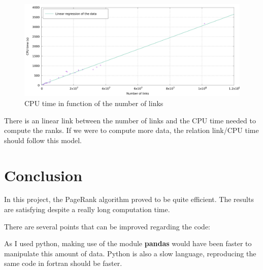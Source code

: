\begin{figure}[htbp]
    \centering
    \includegraphics[width=.8\linewidth]{project/graph.pdf}
    \caption{CPU time in function of the number of links}
\end{figure}

There is an linear link between the number of links and the CPU time needed to compute the ranks. If we were to compute more data, the relation link/CPU time should follow this model.
\section{Conclusion}
In this project, the PageRank algorithm proved to be quite efficient. The results are satisfying despite a really long computation time.

There are several points that can be improved regarding the code:

As I used python, making use of the module \textbf{pandas} would have been faster to manipulate this amount of data. Python is also a slow language, reproducing the same code in fortran should be faster.
